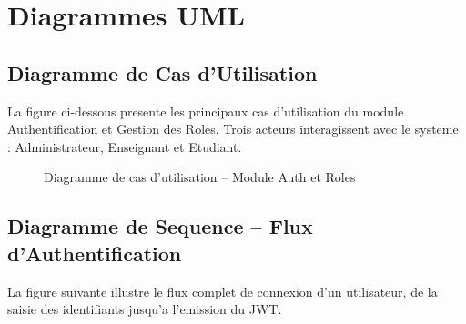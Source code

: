 \documentclass[12pt,a4paper]{report}
\begin{document}
\section{Diagrammes UML}

\subsection{Diagramme de Cas d'Utilisation}

La figure ci-dessous presente les principaux cas d'utilisation du module
Authentification et Gestion des Roles. Trois acteurs interagissent avec
le systeme : Administrateur, Enseignant et Etudiant.

\begin{figure}[H]
\centering
{}
\caption{Diagramme de cas d'utilisation -- Module Auth et Roles}
\label{fig:usecase}
\end{figure}

\subsection{Diagramme de Sequence -- Flux d'Authentification}

La figure suivante illustre le flux complet de connexion d'un
utilisateur, de la saisie des identifiants jusqu'a l'emission du JWT.
\end{document}

